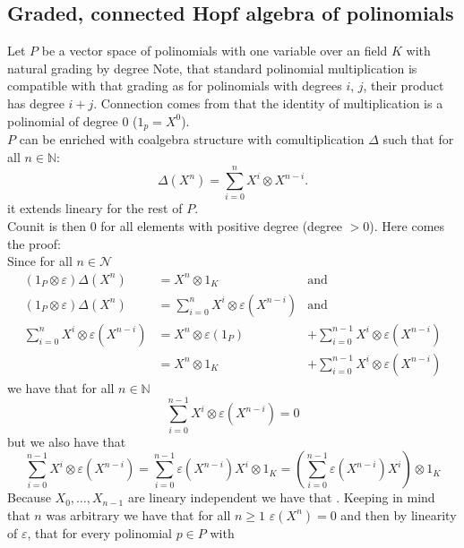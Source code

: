 \documentclass[a4paper, 12pt]{report}
\begin{document}
\subsection{Graded, connected Hopf algebra of polinomials}
Let $P$ be a vector space of polinomials with one variable over an field $K$ with natural grading by degree 
Note, that standard polinomial multiplication is compatible with that grading as for polinomials with 
degrees $i$, $j$, their product has degree $i + j$. Connection comes from that the identity of multiplication 
is a polinomial of degree $0$ ($1_p = X^0$).  \\
$P$ can be enriched with coalgebra structure with comultiplication $\Delta$ such that for all 
$n \in \mathbb{N}$:
\begin{equation*}
\Delta(X^n) = \sum^n_{i = 0} X^i \otimes X^{n-i}.
\end{equation*}
it extends lineary for the rest of $P$. \\
Counit is then $0$ for all elements with positive degree (degree $>0$). Here comes the proof: \\
Since for all $n \in \mathcal{N}$
\begin{align*}
(1_P \otimes \varepsilon )\Delta(X^n) &= X^n \otimes 1_K &\mathrm{and} \\
(1_P \otimes \varepsilon )\Delta(X^n) &= \sum^n_{i = 0} X^i \otimes \varepsilon(X^{n-i}) &\mathrm{and} \\
\sum^n_{i = 0} X^i \otimes \varepsilon(X^{n-i}) &= X^n \otimes \varepsilon(1_P) &+ 
\sum^{n-1}_{i=0} X^i \otimes \varepsilon(X^{n-i}) \\ &= 
X^n \otimes 1_K &+ \sum^{n-1}_{i=0} X^i \otimes \varepsilon(X^{n-i}) 
\end{align*}
we have that for all $n \in \mathbb{N}$
\begin{equation*}
\sum^{n-1}_{i=0} X^i \otimes \varepsilon(X^{n-i}) = 0
\end{equation*}
but we also have that
\begin{equation*}
\sum^{n-1}_{i=0} X^i \otimes \varepsilon(X^{n-i}) = \sum^{n-1}_{i=0} \varepsilon(X^{n-i})X^i \otimes 1_K = 
\left( \sum^{n-1}_{i=0} \varepsilon(X^{n-i})X^i \right)\otimes 1_K
\end{equation*}
Because $X_0, \dots, X_{n-1}$ are lineary independent we have that . Keeping in mind that $n$ was arbitrary we have that for all $n \geq 1$ 
$\varepsilon(X^n) = 0$ and then by linearity of $\varepsilon$, that for every polinomial $p \in P$ with 
\end{document}
